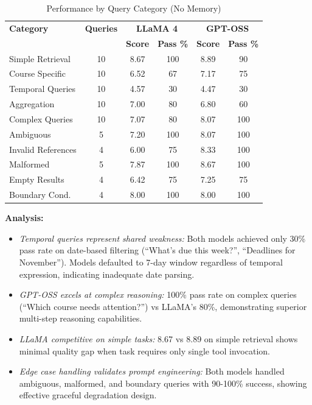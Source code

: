 \documentclass{article}
\begin{document}
\begin{table}[h]
\centering
\caption{Performance by Query Category (No Memory)}
\label{tab:category_performance}
\begin{tabular}{lccccc}
\toprule
\textbf{Category} & \textbf{Queries} & \multicolumn{2}{c}{\textbf{LLaMA 4}} & \multicolumn{2}{c}{\textbf{GPT-OSS}} \\
 & & \textbf{Score} & \textbf{Pass \%} & \textbf{Score} & \textbf{Pass \%} \\
\midrule
Simple Retrieval & 10 & 8.67 & 100 & 8.89 & 90 \\
Course Specific & 10 & 6.52 & 67 & 7.17 & 75 \\
Temporal Queries & 10 & 4.57 & 30 & 4.47 & 30 \\
Aggregation & 10 & 7.00 & 80 & 6.80 & 60 \\
Complex Queries & 10 & 7.07 & 80 & 8.07 & 100 \\
\midrule
Ambiguous & 5 & 7.20 & 100 & 8.07 & 100 \\
Invalid References & 4 & 6.00 & 75 & 8.33 & 100 \\
Malformed & 5 & 7.87 & 100 & 8.67 & 100 \\
Empty Results & 4 & 6.42 & 75 & 7.25 & 75 \\
Boundary Cond. & 4 & 8.00 & 100 & 8.00 & 100 \\
\bottomrule
\end{tabular}
\end{table}

\textbf{Analysis:}
\begin{itemize}
    \item \textit{Temporal queries represent shared weakness:} Both models achieved only 30\% pass rate on date-based filtering (``What's due this week?'', ``Deadlines for November''). Models defaulted to 7-day window regardless of temporal expression, indicating inadequate date parsing.
    
    \item \textit{GPT-OSS excels at complex reasoning:} 100\% pass rate on complex queries (``Which course needs attention?'') vs LLaMA's 80\%, demonstrating superior multi-step reasoning capabilities.
    
    \item \textit{LLaMA competitive on simple tasks:} 8.67 vs 8.89 on simple retrieval shows minimal quality gap when task requires only single tool invocation.
    
    \item \textit{Edge case handling validates prompt engineering:} Both models handled ambiguous, malformed, and boundary queries with 90-100\% success, showing effective graceful degradation design.
\end{itemize}
\end{document}
